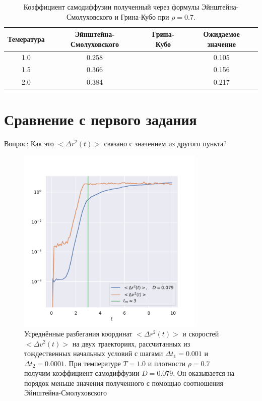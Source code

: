 \documentclass[a4paper,12pt]{article}
\begin{document}
\begin{table}[H]
    \centering
    \caption{Коэффициент самодиффузии полученный через
    формулы Эйнштейна-Смолуховского и Грина-Кубо при 
\(\rho = 0.7\).}
    \label{tab:label}
    \begin{tabular}{|c | c | c | c |}
        \hline
        Темература & Эйнштейна-Смолуховского & Грина-Кубо 
                   & Ожидаемое значение\\
        \hline
        \hline
        1.0 & 0.258 & & {\color{red}0.105} \\
        1.5 & 0.366 & & {\color{red}0.156} \\
        2.0 & 0.384 & & {\color{red}0.217} \\
        \hline
    \end{tabular}
\end{table}

\section{Сравнение с первого задания}

{\color{red} Вопрос: Как это \(<\Delta r^2(t)>\)
связано с значением из другого пункта?}

\begin{figure}[H]
    \centering
    \includegraphics[width=0.8\textwidth]{../../media/tm.pdf}
\caption{Усреднённые разбегания координат \(<\Delta r^2(t)>\) 
и скоростей \(<\Delta v^2(t)>\) на двух траекториях,
рассчитанных из тождественных начальных условий с 
шагами \(\Delta t_1 = 0.001\) и \(\Delta t_2 = 0.0001\).
При температуре \(T = 1.0\) и плотности 
\(\rho = 0.7\) получим коэффициент
самодиффузии \(D = 0.079\). Он оказывается на порядок
меньше значения полученного с помощью соотношения
Эйнштейна-Смолуховского}
\end{figure}
\end{document}
